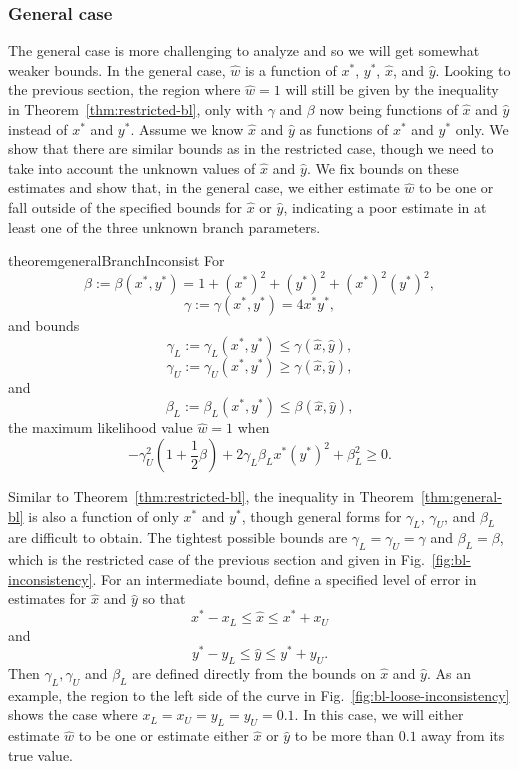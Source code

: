 \documentclass{article}
\begin{document}
\subsubsection*{General case}

The general case is more challenging to analyze and so we will get somewhat weaker bounds.
In the general case, $\hat{w}$ is a function of $x^*$, $y^*$, $\hat{x}$, and $\hat{y}$.
Looking to the previous section, the region where $\hat{w}=1$ will still be given by the inequality in Theorem~\ref{thm:restricted-bl}, only with $\gamma$ and $\beta$ now being functions of $\hat{x}$ and $\hat{y}$ instead of $x^*$ and $y^*$.
Assume we know $\hat{x}$ and $\hat{y}$ as functions of $x^*$ and $y^*$ only.
We show that there are similar bounds as in the restricted case, though we need to take into account the unknown values of $\hat{x}$ and $\hat{y}$.
We fix bounds on these estimates and show that, in the general case, we either estimate $\hat{w}$ to be one or fall outside of the specified bounds for $\hat{x}$ or $\hat{y}$, indicating a poor estimate in at least one of the three unknown branch parameters.
\begin{restatable}{theorem}{generalBranchInconsist}
\label{thm:general-bl}
For
$$
\beta := \beta(x^*, y^*) = 1+(x^*)^2+(y^*)^2+(x^*)^2(y^*)^2,
$$
$$
\gamma := \gamma(x^*, y^*) = 4x^*y^*,
$$
and bounds
$$
\gamma_L := \gamma_{L}(x^*, y^*) \le \gamma(\hat{x}, \hat{y}),
$$
$$
\gamma_U := \gamma_{U}(x^*, y^*) \ge \gamma(\hat{x}, \hat{y}),
$$
and
$$
\beta_L := \beta_{L}(x^*, y^*) \le \beta(\hat{x}, \hat{y}),
$$
the maximum likelihood value $\hat{w}=1$ when
$$
-\gamma_{U}^2\left(1 + \frac{1}{2}\beta\right) + 2\gamma_{L}\beta_{L}x^*(y^*)^2 + \beta_{L}^2 \ge 0.
$$
\end{restatable}
Similar to Theorem~\ref{thm:restricted-bl}, the inequality in Theorem~\ref{thm:general-bl} is also a function of only $x^*$ and $y^*$, though general forms for $\gamma_L$, $\gamma_U$, and $\beta_L$ are difficult to obtain.
The tightest possible bounds are $\gamma_{L} = \gamma_{U} = \gamma$ and $\beta_{L} = \beta$, which is the restricted case of the previous section and given in Fig.~\ref{fig:bl-inconsistency}.
For an intermediate bound, define a specified level of error in estimates for $\hat{x}$ and $\hat{y}$ so that
$$
x^*-x_{L} \le \hat{x} \le x^*+x_{U}
$$
and
$$
y^*-y_{L} \le \hat{y} \le y^*+y_{U}.
$$
Then $\gamma_L, \gamma_U$ and $\beta_L$ are defined directly from the bounds on $\hat{x}$ and $\hat{y}$.
As an example, the region to the left side of the curve in Fig.~\ref{fig:bl-loose-inconsistency} shows the case where $x_L=x_U=y_L=y_U=0.1$.
In this case, we will either estimate $\hat{w}$ to be one or estimate either $\hat{x}$ or $\hat{y}$ to be more than $0.1$ away from its true value.
\end{document}
